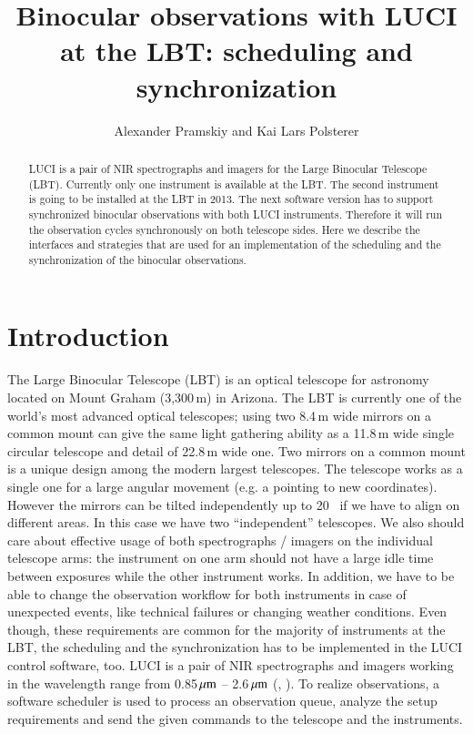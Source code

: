 \documentclass[11pt,twoside]{article}
\begin{document}
\title{Binocular observations with LUCI at the LBT: scheduling and synchronization}
\author{Alexander Pramskiy and Kai Lars Polsterer}

\begin{abstract}
LUCI is a pair of NIR spectrographs and imagers for the Large Binocular Telescope (LBT).
Currently only one instrument is available at the LBT. 
The second instrument is going to be installed at the LBT in 2013. The next software version has to support synchronized
binocular observations with both LUCI instruments.
Therefore it will run the observation cycles synchronously on both telescope sides.
Here we describe the interfaces and strategies that are used for an implementation of the scheduling and the synchronization of the binocular observations. 

\end{abstract}

\section{Introduction}

The Large Binocular Telescope (LBT) is an optical telescope for astronomy located on Mount Graham (3,300\,m) in 
Arizona.
The LBT is currently one of the world's most advanced optical telescopes; using two 8.4\,m wide mirrors on 
a common mount can give the same light gathering ability as a 11.8\,m wide single circular telescope and 
detail of 22.8\,m wide one. Two mirrors on a common mount is a unique design among the 
modern largest telescopes. The telescope works as a single one for a large angular movement 
(e.g. a pointing to new coordinates). However the mirrors can be tilted independently up to 20\arcsec~ if we have to 
align on different areas. In this case we have two ``independent'' 
telescopes. We also should care about effective usage of both spectrographs / imagers on the individual telescope arms: 
the instrument on one arm should not have a large idle time between exposures while the other instrument works.
In addition, we have to be able to change the observation workflow for both instruments in case of unexpected events, like technical failures or changing weather conditions.
Even though, these requirements are common for the majority of instruments at the LBT, the
scheduling and the synchronization has to be implemented in the LUCI control software, too. 
LUCI is a pair of NIR spectrographs and imagers working in the wavelength range
from 0.85\,$\hbox{$\mu$m}$ -- 2.6\,$\hbox{$\mu$m}$ (\cite{2003SPIE.4841..962S}, \cite{polsterer:2011}). To realize observations, 
a software scheduler is used to process an observation queue, analyze the setup requirements and send the given commands to the telescope and the instruments. 
\end{document}
